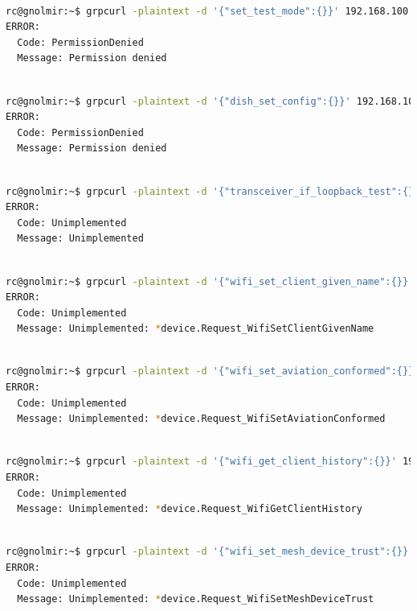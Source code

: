 \documentclass[IN,11pt,twoside,openright,idp,english]{tumthesis}
\begin{document}
\begin{lstlisting}[language=bash,basicstyle=\tiny]

rc@gnolmir:~$ grpcurl -plaintext -d '{"set_test_mode":{}}' 192.168.100.1:9200 SpaceX.API.Device.Device/Handle
ERROR:
  Code: PermissionDenied
  Message: Permission denied
  \end{lstlisting}
\begin{lstlisting}[language=bash,basicstyle=\tiny]

rc@gnolmir:~$ grpcurl -plaintext -d '{"dish_set_config":{}}' 192.168.100.1:9200 SpaceX.API.Device.Device/Handle
ERROR:
  Code: PermissionDenied
  Message: Permission denied
  \end{lstlisting}
\begin{lstlisting}[language=bash,basicstyle=\tiny]

rc@gnolmir:~$ grpcurl -plaintext -d '{"transceiver_if_loopback_test":{}}' 192.168.100.1:9200 SpaceX.API.Device.Device/Handle
ERROR:
  Code: Unimplemented
  Message: Unimplemented
  \end{lstlisting}
\begin{lstlisting}[language=bash,basicstyle=\tiny]

rc@gnolmir:~$ grpcurl -plaintext -d '{"wifi_set_client_given_name":{}}' 192.168.100.1:9200 SpaceX.API.Device.Device/Handle
ERROR:
  Code: Unimplemented
  Message: Unimplemented: *device.Request_WifiSetClientGivenName
  \end{lstlisting}
\begin{lstlisting}[language=bash,basicstyle=\tiny]

rc@gnolmir:~$ grpcurl -plaintext -d '{"wifi_set_aviation_conformed":{}}' 192.168.100.1:9200 SpaceX.API.Device.Device/Handle
ERROR:
  Code: Unimplemented
  Message: Unimplemented: *device.Request_WifiSetAviationConformed
  \end{lstlisting}
\begin{lstlisting}[language=bash,basicstyle=\tiny]

rc@gnolmir:~$ grpcurl -plaintext -d '{"wifi_get_client_history":{}}' 192.168.100.1:9200 SpaceX.API.Device.Device/Handle
ERROR:
  Code: Unimplemented
  Message: Unimplemented: *device.Request_WifiGetClientHistory
  \end{lstlisting}
\begin{lstlisting}[language=bash,basicstyle=\tiny]

rc@gnolmir:~$ grpcurl -plaintext -d '{"wifi_set_mesh_device_trust":{}}' 192.168.100.1:9200 SpaceX.API.Device.Device/Handle
ERROR:
  Code: Unimplemented
  Message: Unimplemented: *device.Request_WifiSetMeshDeviceTrust
  \end{lstlisting}
\end{document}
